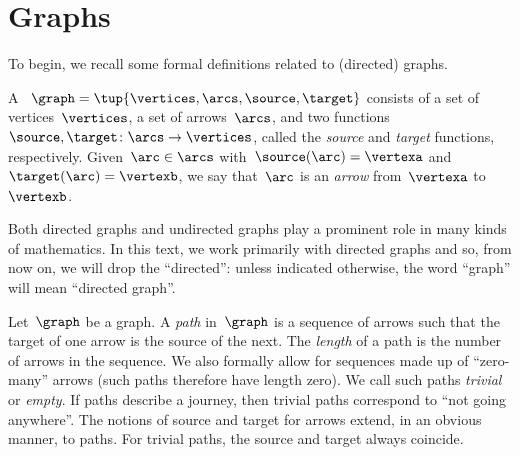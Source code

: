 

\section{Graphs}

\publictodomessage
{}
To begin, we recall some formal definitions related to (directed) graphs.


\begin{definition}[Graph]
    \label{def:Graph}
    A \emph{}~$\graph=\tup{\vertices,\arcs, \source,\target}$ consists of a set of vertices~$\vertices$, a set of arrows~$\arcs$, and two functions~$\source,\target \colon \arcs \to \vertices$, called the \emph{source} and \emph{target} functions, respectively.
    Given~$\arc\in \arcs$ with~$\source(\arc)=\vertexa$ and~$\target(\arc)=\vertexb$, we say that~$\arc$ is an \emph{arrow} from~$\vertexa$ to~$\vertexb$.
\end{definition}

\begin{remark}
    Both directed graphs and undirected graphs play a prominent role in many kinds of mathematics.
    In this text, we work primarily with directed graphs and so, from now on, we will drop the ``directed'': unless indicated otherwise, the word ``graph'' will mean ``directed graph''.
\end{remark}

\begin{definition}[Path]
    \label{def:path}
    Let~$\graph$ be a graph.
    A \emph{path} in~$\graph$ is a sequence of arrows such that the target of one arrow is the source of the next.
    The \emph{length} of a path is the number of arrows in the sequence.
    We also formally allow for sequences made up of ``zero-many'' arrows (such paths therefore have length zero).
    We call such paths \emph{trivial} or \emph{empty}.
    If paths describe a journey, then trivial paths correspond to ``not going anywhere''.
    The notions of source and target for arrows extend, in an obvious manner, to paths.
    For trivial paths, the source and target always coincide.
\end{definition}
